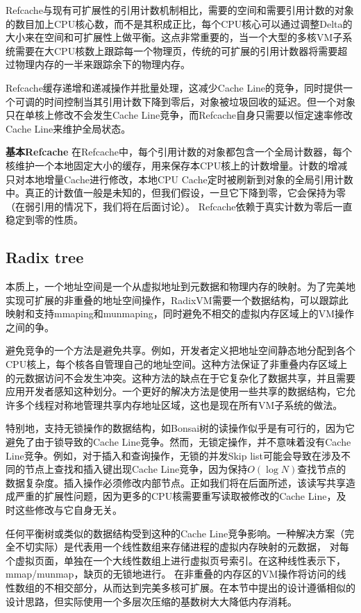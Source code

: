 Refcache与现有可扩展性的引用计数机制相比，需要的空间和需要引用计数的对象的数目加上CPU核心数，而不是其积成正比，每个CPU核心可以通过调整Delta的大小来在空间和可扩展性上做平衡。这点非常重要的，当一个大型的多核VM子系统需要在大CPU核数上跟踪每一个物理页，传统的可扩展的引用计数器将需要超过物理内存的一半来跟踪余下的物理内存。

Refcache缓存递增和递减操作并批量处理，这减少Cache
Line的竞争，同时提供一个可调的时间控制当其引用计数下降到零后，对象被垃圾回收的延迟。但一个对象只在单核上修改不会发生Cache
Line竞争，而Refcache自身只需要以恒定速率修改Cache Line来维护全局状态。

\textbf{基本Refcache}
在Refcache中，每个引用计数的对象都包含一个全局计数器，每个核维护一个本地固定大小的缓存，用来保存本CPU核上的计数增量。计数的增减只对本地增量Cache进行修改，本地CPU
Cache定时被刷新到对象的全局引用计数中。真正的计数值一般是未知的，但我们假设，一旦它下降到零，它会保持为零（在弱引用的情况下，我们将在后面讨论）。
Refcache依赖于真实计数为零后一直稳定到零的性质。

\subsection{Radix tree}
本质上，一个地址空间是一个从虚拟地址到元数据和物理内存的映射。为了完美地实现可扩展的非重叠的地址空间操作，RadixVM需要一个数据结构，可以跟踪此映射和支持mmaping和munmaping，同时避免不相交的虚拟内存区域上的VM操作之间的争。

避免竞争的一个方法是避免共享。例如，开发者定义把地址空间静态地分配到各个CPU核上，每个核各自管理自己的地址空间。这种方法保证了非重叠内存区域上的元数据访问不会发生冲突。这种方法的缺点在于它复杂化了数据共享，并且需要应用开发者感知这种划分。一个更好的解决方法是使用一些共享的数据结构，它允许多个线程对称地管理共享内存地址区域，这也是现在所有VM子系统的做法。

特别地，支持无锁操作的数据结构，如Bonsai树的读操作似乎是有可行的，因为它避免了由于锁导致的Cache
Line竞争。然而，无锁定操作，并不意味着没有Cache
Line竞争。例如，对于插入和查询操作，无锁的并发Skip
list可能会导致在涉及不同的节点上查找和插入键出现Cache
Line竞争，因为保持$O(\log
N)$查找节点的数据复杂度。插入操作必须修改内部节点。正如我们将在后面所述，该读写共享造成严重的扩展性问题，因为更多的CPU核需要重写读取被修改的Cache
Line，及时这些修改与它自身无关。

任何平衡树或类似的数据结构受到这种的Cache
Line竞争影响。一种解决方案（完全不切实际）是代表用一个线性数组来存储进程的虚拟内存映射的元数据，
对每个虚拟页面，单独在一个大线性数组上进行虚拟页号索引。在这种线性表示下，mmap/munmap，缺页的无锁地进行。
在非重叠的内存区的VM操作将访问的线性数组的不相交部分，从而达到完美多核可扩展。在本节中提出的设计遵循相似的设计思路，但实际使用一个多层次压缩的基数树大大降低内存消耗。

